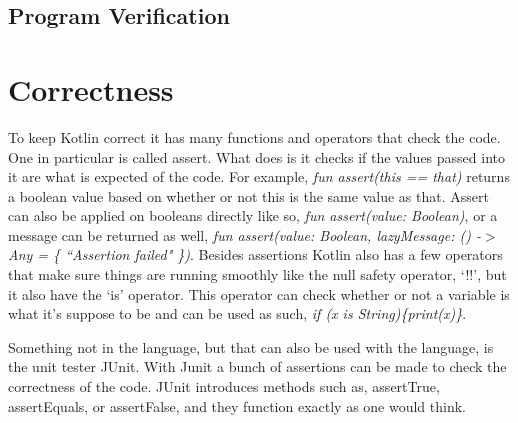 
\begin{flushleft}
\section*{Program Verification}
\end{flushleft}

\section*{Correctness}
\hspace{1em}To keep Kotlin correct it has many functions and operators that check the code. One in particular is called assert. What does is it checks if the values passed into it are what is expected of the code. For example, \textit{fun assert(this == that)} returns a boolean value based on whether or not this is the same value as that. Assert can also be applied on booleans directly like so, \textit{fun assert(value: Boolean)}, or a message can be returned as well, \textit{fun assert(value: Boolean, lazyMessage: () -$>$ Any = \{ ``Assertion failed" \})}. Besides assertions Kotlin also has a few operators that make sure things are running smoothly like the null safety operator, `!!', but it also have the `is' operator. This operator can check whether or not a variable is what it's suppose to be and can be used as such, \textit{if (x is String)\{print(x)\}}. 

\hspace{1em}Something not in the language, but that can also be used with the language, is the unit tester JUnit. With Junit a bunch of assertions can be made to check the correctness of the code. JUnit introduces methods such as, assertTrue, assertEquals, or assertFalse, and they function exactly as one would think. 